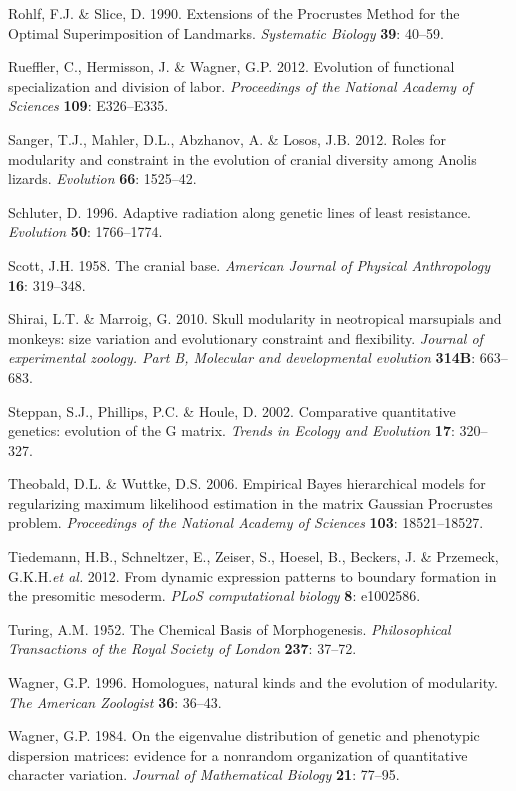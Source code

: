 \documentclass[12pt,]{article}
\begin{document}
Rohlf, F.J. \& Slice, D. 1990. Extensions of the Procrustes Method for
the Optimal Superimposition of Landmarks. \emph{Systematic Biology}
\textbf{39}: 40--59.

Rueffler, C., Hermisson, J. \& Wagner, G.P. 2012. Evolution of
functional specialization and division of labor. \emph{Proceedings of
the National Academy of Sciences} \textbf{109}: E326--E335.

Sanger, T.J., Mahler, D.L., Abzhanov, A. \& Losos, J.B. 2012. Roles for
modularity and constraint in the evolution of cranial diversity among
Anolis lizards. \emph{Evolution} \textbf{66}: 1525--42.

Schluter, D. 1996. Adaptive radiation along genetic lines of least
resistance. \emph{Evolution} \textbf{50}: 1766--1774.

Scott, J.H. 1958. The cranial base. \emph{American Journal of Physical
Anthropology} \textbf{16}: 319--348.

Shirai, L.T. \& Marroig, G. 2010. Skull modularity in neotropical
marsupials and monkeys: size variation and evolutionary constraint and
flexibility. \emph{Journal of experimental zoology. Part B, Molecular
and developmental evolution} \textbf{314B}: 663--683.

Steppan, S.J., Phillips, P.C. \& Houle, D. 2002. Comparative
quantitative genetics: evolution of the G matrix. \emph{Trends in
Ecology and Evolution} \textbf{17}: 320--327.

Theobald, D.L. \& Wuttke, D.S. 2006. Empirical Bayes hierarchical models
for regularizing maximum likelihood estimation in the matrix Gaussian
Procrustes problem. \emph{Proceedings of the National Academy of
Sciences} \textbf{103}: 18521--18527.

Tiedemann, H.B., Schneltzer, E., Zeiser, S., Hoesel, B., Beckers, J. \&
Przemeck, G.K.H.\emph{et al.} 2012. From dynamic expression patterns to
boundary formation in the presomitic mesoderm. \emph{PLoS computational
biology} \textbf{8}: e1002586.

Turing, A.M. 1952. The Chemical Basis of Morphogenesis.
\emph{Philosophical Transactions of the Royal Society of London}
\textbf{237}: 37--72.

Wagner, G.P. 1996. Homologues, natural kinds and the evolution of
modularity. \emph{The American Zoologist} \textbf{36}: 36--43.

Wagner, G.P. 1984. On the eigenvalue distribution of genetic and
phenotypic dispersion matrices: evidence for a nonrandom organization of
quantitative character variation. \emph{Journal of Mathematical Biology}
\textbf{21}: 77--95.
\end{document}
